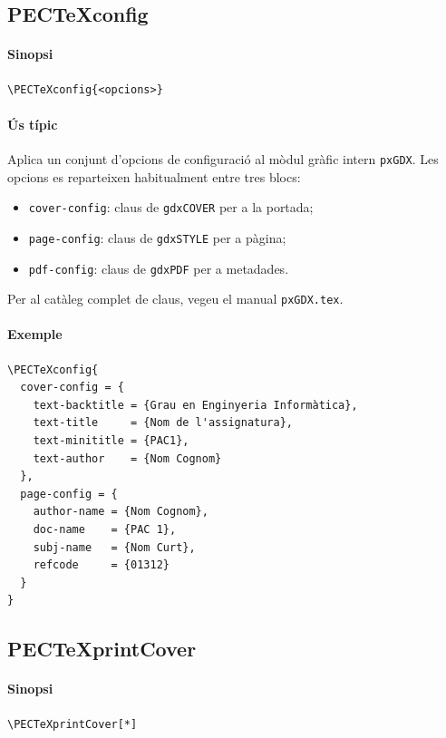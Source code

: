 \documentclass[default]{P3CTeX}
\begin{document}
\subsection{PECTeXconfig}

\paragraph*{Sinopsi}
\begin{verbatim}
\PECTeXconfig{<opcions>}
\end{verbatim}

\paragraph*{Ús típic}
Aplica un conjunt d'opcions de configuració al mòdul gràfic intern
\texttt{pxGDX}. Les opcions es reparteixen habitualment entre tres blocs:
\begin{itemize}
  \item \texttt{cover-config}: claus de \texttt{gdxCOVER} per a la portada;
  \item \texttt{page-config}: claus de \texttt{gdxSTYLE} per a pàgina;
  \item \texttt{pdf-config}: claus de \texttt{gdxPDF} per a metadades.
\end{itemize}
Per al catàleg complet de claus, vegeu el manual \texttt{pxGDX.tex}.

\paragraph*{Exemple}
\begin{verbatim}
\PECTeXconfig{
  cover-config = {
    text-backtitle = {Grau en Enginyeria Informàtica},
    text-title     = {Nom de l'assignatura},
    text-minititle = {PAC1},
    text-author    = {Nom Cognom}
  },
  page-config = {
    author-name = {Nom Cognom},
    doc-name    = {PAC 1},
    subj-name   = {Nom Curt},
    refcode     = {01312}
  }
}
\end{verbatim}

\subsection{PECTeXprintCover}

\paragraph*{Sinopsi}
\begin{verbatim}
\PECTeXprintCover[*]
\end{verbatim}
\end{document}
